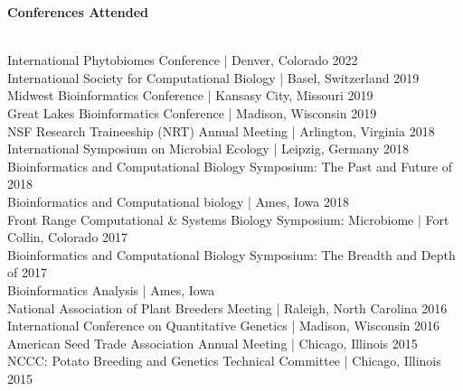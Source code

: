\vspace{0.4cm}
{\Large \textbf{Conferences Attended}}\\[-0.4cm]
\makebox[\linewidth]{\rule{1.0\textwidth}{0.4pt}}\\
\vspace{0cm}


\begin{addmargin}[0.1cm]{0cm}
% 
International Phytobiomes Conference | Denver, Colorado \hfill 2022 \\
% 
International Society for Computational Biology | Basel, Switzerland \hfill 2019 \\
% 
Midwest Bioinformatics Conference | Kansasy City, Missouri \hfill 2019 \\
%
Great Lakes Bioinformatics Conference | Madison, Wisconsin \hfill 2019 \\
%
NSF Research Traineeship (NRT) Annual Meeting | Arlington, Virginia \hfill 2018 \\
%
International Symposium on Microbial Ecology | Leipzig, Germany \hfill 2018 \\
%
Bioinformatics and Computational Biology Symposium: The Past and Future of \hfill 2018 \\ 
    \tab Bioinformatics and Computational biology | Ames, Iowa \hfill 2018 \\
%
Front Range Computational \& Systems Biology Symposium: Microbiome | Fort Collin, Colorado \hfill 2017 \\
%
Bioinformatics and Computational Biology Symposium: The Breadth and Depth of \hfill 2017 \\
    \tab Bioinformatics Analysis |  Ames, Iowa \\
%
National Association of Plant Breeders Meeting | Raleigh, North Carolina \hfill 2016 \\
%
International Conference on Quantitative Genetics | Madison, Wisconsin \hfill 2016 \\
%
American Seed Trade Association Annual Meeting | Chicago, Illinois \hfill 2015 \\
%
NCCC: Potato Breeding and Genetics Technical Committee | Chicago, Illinois \hfill 2015 \\
\end{addmargin}




